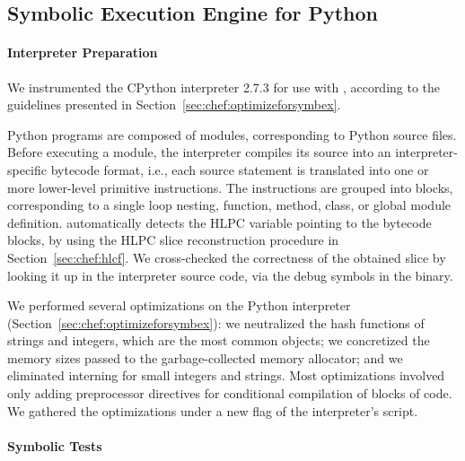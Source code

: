 \subsection{Symbolic Execution Engine for Python}
\label{sec:eval:python-proto}

\paragraph{Interpreter Preparation}

We instrumented the CPython interpreter 2.7.3 for use with \chef, according to the guidelines presented in Section~\ref{sec:chef:optimizeforsymbex}.

Python programs are composed of modules, corresponding to Python source files.  Before executing a module, the interpreter compiles its source into an interpreter-specific bytecode format, i.e., each source statement is translated into one or more lower-level primitive instructions.  The instructions are grouped into blocks, corresponding to a single loop nesting, function, method, class, or global module definition.
%
\chef automatically detects the HLPC variable pointing to the bytecode blocks, by using the HLPC slice reconstruction procedure in Section~\ref{sec:chef:hlcf}.  We cross-checked the correctness of the obtained slice by looking it up in the interpreter source code, via the debug symbols in the binary.

We performed several optimizations on the Python interpreter (Section~\ref{sec:chef:optimizeforsymbex}): we neutralized the hash functions of strings and integers, which are the most common objects; we concretized the memory sizes passed to the garbage-collected memory allocator; and we eliminated interning for small integers and strings.    
%
Most optimizations involved only adding preprocessor directives for conditional compilation of blocks of code.
%
We gathered the optimizations under a new  flag of the interpreter's  script.

\paragraph{Symbolic Tests}

